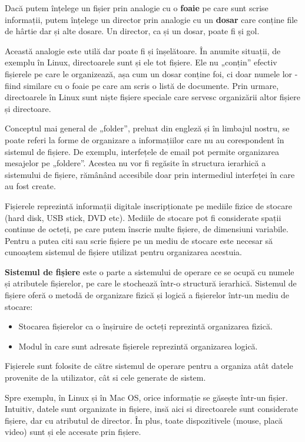 Dacă putem înțelege un fișier prin analogie cu o \textbf{foaie} pe care sunt
scrise informații, putem înțelege un director prin analogie cu un \textbf{dosar}
care conține file de hârtie dar și alte dosare. Un director, ca și un dosar,
poate fi și gol.

Această analogie este utilă dar poate fi și înșelătoare. În anumite situații, de
exemplu în Linux, directoarele sunt și ele tot fișiere. Ele nu „conțin” efectiv
fișierele pe care le organizează, așa cum un dosar conține foi, ci doar numele
lor - fiind similare cu o foaie pe care am scris o listă de documente. Prin
urmare, directoarele în Linux sunt niște fișiere speciale care servesc
organizării altor fișiere și directoare.

Conceptul mai general de „folder”, preluat din engleză și în limbajul nostru, se
poate referi la forme de organizare a informațiilor care nu au corespondent în
sistemul de fișiere. De exemplu, interfețele de email pot permite organizarea
mesajelor pe „foldere”. Acestea nu vor fi regăsite în structura ierarhică a
sistemului de fișiere, rămânând accesibile doar prin intermediul interfeței în
care au fost create.

Fișierele reprezintă informații digitale inscripționate pe mediile fizice de
stocare (hard disk, USB stick, DVD etc). Mediile de stocare pot fi considerate
spații continue de octeți, pe care putem înscrie multe fișiere, de dimensiuni
variabile. Pentru a putea citi sau scrie fișiere pe un mediu de stocare este
necesar să cunoaștem sistemul de fișiere utilizat pentru organizarea acestuia.

\textbf{Sistemul de fișiere} este o parte a sistemului de operare ce se ocupă cu
numele și atributele fișierelor, pe care le stochează într-o structură
ierarhică. Sistemul de fișiere oferă o metodă de organizare fizică și logică a
fișierelor într-un mediu de stocare:

\begin{itemize}
	\item Stocarea fișierelor ca o înșiruire de octeți reprezintă
		organizarea fizică.
	\item Modul în care sunt adresate fișierele reprezintă organizarea
		logică.
\end{itemize}

Fișierele sunt folosite de către sistemul de operare pentru a organiza atât
datele provenite de la utilizator, cât si cele generate de sistem.

Spre exemplu, în Linux și în Mac OS, orice informație se găsește într-un fișier.
Intuitiv, datele sunt organizate in fișiere, insă aici si directoarele sunt
considerate fișiere, dar cu atributul de director. În plus, toate dispozitivele
(mouse, placă video) sunt și ele accesate prin fișiere.

